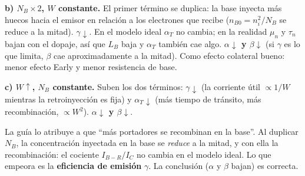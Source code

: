 \documentclass[11pt,a4paper]{article}
\newcommand{\aT}{\alpha_T}
\begin{document}
\textbf{b) $N_B\times2$, $W$ constante.} El primer término se duplica: la base inyecta más huecos
hacia el emisor en relación a los electrones que recibe ($n_{B0}=n_i^2/N_B$ se reduce a la mitad).
$\gamma\downarrow$. En el modelo ideal $\aT$ no cambia; en la realidad $\mu_n$ y $\tau_n$ bajan con
el dopaje, así que $L_B$ baja y $\aT$ también cae algo. \textbf{$\alpha\downarrow$ y
$\beta\downarrow$} (si $\gamma$ es lo que limita, $\beta$ cae aproximadamente a la mitad).
Como efecto colateral bueno: menor efecto Early y menor resistencia de base.

\textbf{c) $W\uparrow$, $N_B$ constante.} Suben los dos términos: $\gamma\downarrow$ (la corriente
útil $\propto1/W$ mientras la retroinyección es fija) y $\aT\downarrow$ (más tiempo de tránsito,
más recombinación, $\propto W^2$). \textbf{$\alpha\downarrow$ y $\beta\downarrow$}.

\begin{ojo}[mecanismo en (b)]
La guía lo atribuye a que ``más portadores se recombinan en la base''. Al duplicar $N_B$, la
concentración inyectada en la base se \emph{reduce} a la mitad, y con ella la recombinación: el
cociente $I_{B-R}/I_C$ no cambia en el modelo ideal. Lo que empeora es la \textbf{eficiencia de
emisión} $\gamma$. La conclusión ($\alpha$ y $\beta$ bajan) es correcta.
\end{ojo}
\end{document}
